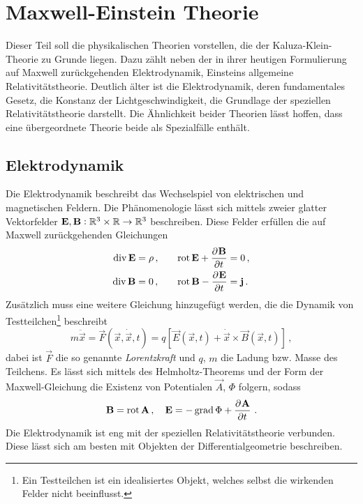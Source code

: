 \chapter{Maxwell-Einstein Theorie}
Dieser Teil soll die physikalischen Theorien vorstellen, die der
Kaluza-Klein-Theorie zu Grunde liegen. Dazu zählt neben der 
in ihrer heutigen Formulierung auf Maxwell zurückgehenden 
Elektrodynamik, Einsteins allgemeine Relativitätstheorie. 
Deutlich älter ist die Elektrodynamik, deren fundamentales Gesetz, die Konstanz
der Lichtgeschwindigkeit, die Grundlage der speziellen Relativitätstheorie
darstellt.
Die Ähnlichkeit beider Theorien lässt hoffen, dass eine 
übergeordnete Theorie beide als Spezialfälle enthält. 
\section{Elektrodynamik}
Die Elektrodynamik beschreibt das Wechselspiel von elektrischen und 
magnetischen Feldern. Die Phänomenologie lässt sich mittels zweier glatter Vektorfelder
$\mathbf{E},\mathbf{B}:\mathbb{R}^3\times\mathbb{R}\to \mathbb{R}^3$ beschreiben.
Diese Felder erfüllen die auf Maxwell zurückgehenden Gleichungen 
\begin{equation}
  \begin{alignedat}{2}
    \Div\vec{E} &= \rho\,,  & \qquad \Rot\vec{E}+\dpd{\vec{B}}{t}&
    =0\,,\\
    \Div\vec{B} &= 0\,,& \qquad\Rot\vec{B}-\dpd{\vec{E}}{t}&
    =\vec{j}\,.
  \end{alignedat}
\end{equation}
Zusätzlich muss eine weitere Gleichung hinzugefügt werden, die die Dynamik von
Testteilchen\footnote{Ein Testteilchen ist ein idealisiertes Objekt, welches
selbst die wirkenden Felder nicht beeinflusst.} beschreibt
\begin{equation}
m\ddot{\vec{x}}=\vec{F}(\vec{x},\dot{\vec{x}},t)
=q\left[\vec{E}(\vec{x},t)+\dot{\vec{x}}\times\vec{B}(\vec{x},t)\right]\,,
\end{equation}
dabei ist $\vec{F}$ die so genannte \emph{Lorentzkraft} und $q$, $m$ die
Ladung bzw. Masse des Teilchens.
Es lässt sich mittels des Helmholtz-Theorems und der Form der Maxwell-Gleichung
die Existenz von Potentialen $\vec{A}$, $\Phi$ folgern, sodass
\begin{equation}
\vec{B}=\Rot \vec{A}\,,\quad
\vec{E}=-\Grad\Phi+\dpd{\vec{A}}{t}\,.\label{eq:Vecpot}
\end{equation}
Die Elektrodynamik ist eng mit der speziellen Relativitätstheorie verbunden.
Diese lässt sich am besten mit Objekten der Differentialgeometrie beschreiben.
